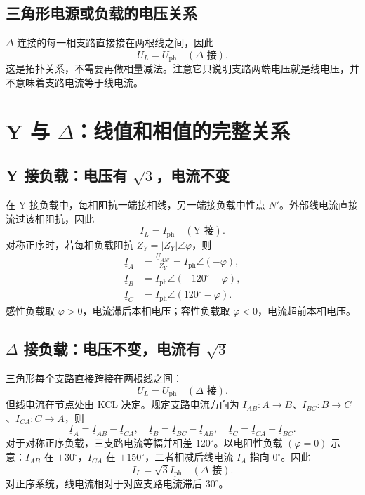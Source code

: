 \documentclass[circuit]{CarlosTexRpt}
\newcommand{\phas}[1]{\underline{#1}}
\newcommand{\dgr}{^\circ}
\begin{document}
\subsection{三角形电源或负载的电压关系}

\(\Delta\) 连接的每一相支路直接接在两根线之间，因此
\begin{equation}
  \boxed{U_L=U_{\mathrm{ph}}\quad(\Delta\text{ 接})}.
\end{equation}
这是拓扑关系，不需要再做相量减法。注意它只说明支路两端电压就是线电压，并不意味着支路电流等于线电流。

\section{Y 与 \texorpdfstring{$\Delta$}{Delta}：线值和相值的完整关系}

\subsection{Y 接负载：电压有 \texorpdfstring{$\sqrt3$}{sqrt3}，电流不变}

在 Y 接负载中，每相阻抗一端接相线，另一端接负载中性点 \(N'\)。外部线电流直接流过该相阻抗，因此
\begin{equation}
  \boxed{I_L=I_{\mathrm{ph}}\quad(\mathrm{Y}\text{ 接})}.
\end{equation}
对称正序时，若每相负载阻抗 \(Z_Y=|Z_Y|\angle\varphi\)，则
\begin{align}
  \phas I_A&=\frac{\phas U_{AN'}}{Z_Y}=I_{\mathrm{ph}}\angle(-\varphi),\\
  \phas I_B&=I_{\mathrm{ph}}\angle(-120\dgr-\varphi),\\
  \phas I_C&=I_{\mathrm{ph}}\angle(120\dgr-\varphi).
\end{align}
感性负载取 \(\varphi>0\)，电流滞后本相电压；容性负载取 \(\varphi<0\)，电流超前本相电压。

\subsection{\texorpdfstring{$\Delta$}{Delta} 接负载：电压不变，电流有 \texorpdfstring{$\sqrt3$}{sqrt3}}

三角形每个支路直接跨接在两根线之间：
\begin{equation}
  \boxed{U_L=U_{\mathrm{ph}}\quad(\Delta\text{ 接})}.
\end{equation}
但线电流在节点处由 KCL 决定。规定支路电流方向为 \(I_{AB}:A\to B\)、\(I_{BC}:B\to C\)、\(I_{CA}:C\to A\)，则
\begin{equation}
  \boxed{\phas I_A=\phas I_{AB}-\phas I_{CA}},\quad
  \phas I_B=\phas I_{BC}-\phas I_{AB},\quad
  \phas I_C=\phas I_{CA}-\phas I_{BC}.
  \label{eq:delta-line-currents}
\end{equation}
对于对称正序负载，三支路电流等幅并相差 \(120^\circ\)。以电阻性负载 \((\varphi=0)\) 示意：\(I_{AB}\) 在 \(+30^\circ\)，\(I_{CA}\) 在 \(+150^\circ\)，二者相减后线电流 \(I_A\) 指向 \(0^\circ\)。因此
\begin{equation}
  \boxed{I_L=\sqrt3 I_{\mathrm{ph}}\quad(\Delta\text{ 接})}.
\end{equation}
对正序系统，线电流相对于对应支路电流滞后 \(30^\circ\)。
\end{document}
